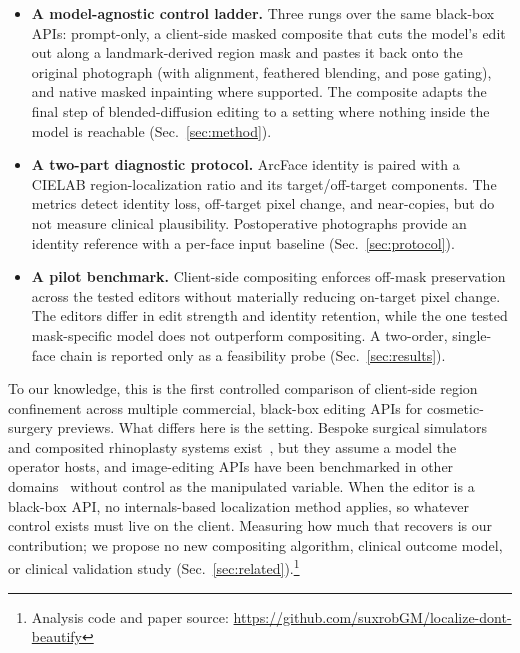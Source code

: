 \begin{itemize}
  \item \textbf{A model-agnostic control ladder.} Three rungs over the same
  black-box APIs: prompt-only, a client-side masked composite that cuts
  the model's edit out along a landmark-derived region mask and pastes it back
  onto the original photograph (with alignment, feathered blending, and pose
  gating), and native masked inpainting where supported. The composite adapts the final
  step of blended-diffusion editing to a setting where nothing inside the model
  is reachable (Sec.~\ref{sec:method}).
  \item \textbf{A two-part diagnostic protocol.} ArcFace identity is paired with
  a CIELAB region-localization ratio and its target/off-target components. The
  metrics detect identity loss, off-target pixel change, and near-copies, but do
  not measure clinical plausibility. Postoperative photographs provide an
  identity reference with a per-face input baseline (Sec.~\ref{sec:protocol}).
  \item \textbf{A pilot benchmark.} Client-side compositing enforces off-mask
  preservation across the tested editors without materially reducing on-target
  pixel change. The editors differ in edit strength and identity retention, while
  the one tested mask-specific model does not outperform compositing. A
  two-order, single-face chain is reported only as a feasibility probe
  (Sec.~\ref{sec:results}).
\end{itemize}

To our knowledge, this is the first controlled comparison of client-side region
confinement across multiple commercial, black-box editing APIs for
cosmetic-surgery previews. What differs here is the setting. Bespoke surgical
simulators and composited rhinoplasty systems
exist~\cite{knoedler2024rhinoplastygan,agarwal2026envisage}, but they assume a
model the operator hosts, and image-editing APIs have been benchmarked in other
domains~\cite{qian2025giebench,gptimgeval2025} without control as the
manipulated variable. When the editor is a black-box API, no
internals-based localization method applies, so whatever control exists must
live on the client. Measuring how much that recovers is our contribution; we
propose no new compositing algorithm, clinical outcome model, or clinical
validation study (Sec.~\ref{sec:related}).\footnote{Analysis code and paper source:
\url{https://github.com/suxrobGM/localize-dont-beautify}}
